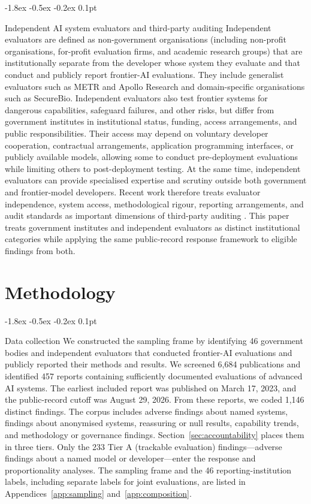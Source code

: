 \documentclass{article}
\makeatletter
\renewcommand{\subsection}{%
  \@startsection{subsection}{2}{\z@}%
                {-1.8ex \@plus -0.5ex \@minus -0.2ex}%
                {0.1pt}%
                {\normalsize\bf\raggedright}%
}
\makeatother
\begin{document}
\subsection{Independent AI system evaluators and third-party auditing}
 Independent evaluators are defined as non-government organisations (including non-profit organisations, for-profit evaluation firms, and academic research groups) that are institutionally separate from the developer whose system they evaluate and that conduct and publicly report frontier-AI evaluations. They include generalist evaluators such as METR and Apollo Research and domain-specific organisations such as SecureBio. Independent evaluators also test frontier systems for dangerous capabilities, safeguard failures, and other risks, but differ from government institutes in institutional status, funding, access arrangements, and public responsibilities. Their access may depend on voluntary developer cooperation, contractual arrangements, application programming interfaces, or publicly available models, allowing some to conduct pre-deployment evaluations while limiting others to post-deployment testing. At the same time, independent evaluators can provide specialised expertise and scrutiny outside both government and frontier-model developers. Recent work therefore treats evaluator independence, system access, methodological rigour, reporting arrangements, and audit standards as important dimensions of third-party auditing \citep{falco2021,costanzachock2023,brundage2026,birhane2024}. This paper treats government institutes and independent evaluators as distinct institutional categories while applying the same public-record response framework to eligible findings from both.

\section{Methodology}\label{sec:methods}
\subsection{Data collection}\label{sec:data}
We constructed the sampling frame by identifying 46 government bodies and independent evaluators that conducted frontier-AI evaluations and publicly reported their methods and results. We screened 6,684 publications and identified 457 reports containing sufficiently documented evaluations of advanced AI systems. The earliest included report was published on March 17, 2023, and the public-record cutoff was August 29, 2026. From these reports, we coded 1,146 distinct findings. The corpus includes adverse findings about named systems, findings about anonymised systems, reassuring or null results, capability trends, and methodology or governance findings. Section~\ref{sec:accountability} places them in three tiers. Only the 233 Tier A (trackable evaluation) findings---adverse findings about a named model or developer---enter the response and proportionality analyses. The sampling frame and the 46 reporting-institution labels, including separate labels for joint evaluations, are listed in Appendices~\ref{app:sampling} and~\ref{app:composition}.
\end{document}
